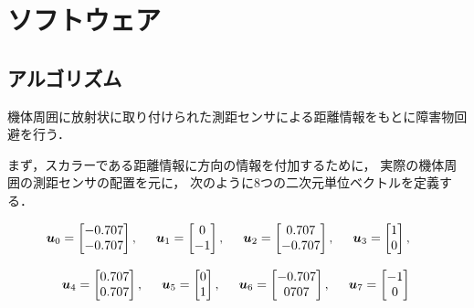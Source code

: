\documentclass[11pt,a4paper]{jsarticle}
\begin{document}
\section{ソフトウェア} 

\subsection{アルゴリズム}
  機体周囲に放射状に取り付けられた測距センサによる距離情報をもとに障害物回避を行う．

  まず，スカラーである距離情報に方向の情報を付加するために，
  実際の機体周囲の測距センサの配置を元に，
  次のように8つの二次元単位ベクトルを定義する．

  \begin{eqnarray}
    \bm{u}_0 = \begin{bmatrix} -0.707 \\ -0.707 \end{bmatrix}, \hspace{5mm} \nonumber
    \bm{u}_1 = \begin{bmatrix}  0     \\ -1     \end{bmatrix}, \hspace{5mm}
    \bm{u}_2 = \begin{bmatrix}  0.707 \\ -0.707 \end{bmatrix}, \hspace{5mm}
    \bm{u}_3 = \begin{bmatrix}  1     \\  0     \end{bmatrix}, \hspace{5mm} \\[3mm]
    \bm{u}_4 = \begin{bmatrix}  0.707 \\  0.707 \end{bmatrix}, \hspace{5mm} \nonumber
    \bm{u}_5 = \begin{bmatrix}  0     \\  1     \end{bmatrix}, \hspace{5mm}
    \bm{u}_6 = \begin{bmatrix} -0.707 \\  0707  \end{bmatrix}, \hspace{5mm}
    \bm{u}_7 = \begin{bmatrix} -1     \\  0     \end{bmatrix}  \hspace{5mm} \\ \nonumber
  \end{eqnarray}
\end{document}
